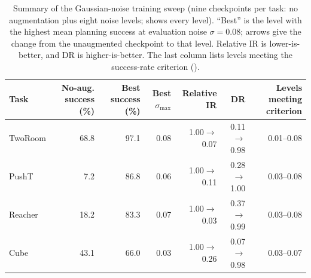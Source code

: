 \begin{table}[t]
\centering
\caption{Summary of the Gaussian-noise training sweep (nine checkpoints per task: no augmentation plus eight noise levels;  shows every level). ``Best'' is the level with the highest mean planning success at evaluation noise $\sigma=0.08$; arrows give the change from the unaugmented checkpoint to that level. Relative IR is lower-is-better, and DR is higher-is-better. The last column lists levels meeting the success-rate criterion ().}
\label{tab:full-sweep-compact}
\footnotesize
\setlength{\tabcolsep}{3.5pt}
\begin{tabular}{lrrrrrr}
\toprule
Task & No-aug. success (\%) & Best success (\%) & Best $\sigma_{\max}$ & Relative IR & DR & Levels meeting criterion \\
\midrule
TwoRoom & 68.8 & 97.1 & 0.08 & 1.00$\to$0.07 & 0.11$\to$0.98 & 0.01--0.08 \\
PushT & 7.2 & 86.8 & 0.06 & 1.00$\to$0.11 & 0.28$\to$1.00 & 0.03--0.08 \\
Reacher & 18.2 & 83.3 & 0.07 & 1.00$\to$0.03 & 0.37$\to$0.99 & 0.03--0.08 \\
Cube & 43.1 & 66.0 & 0.03 & 1.00$\to$0.26 & 0.07$\to$0.98 & 0.03--0.07 \\
\bottomrule
\end{tabular}
\end{table}
